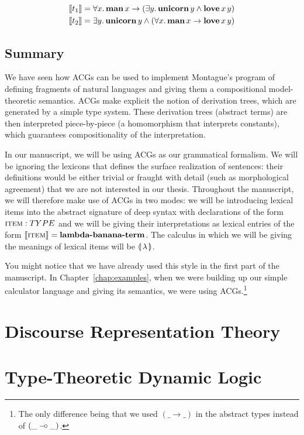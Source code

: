\begin{align*}
  \llbracket t_1 \rrbracket &= \forall x.\, \textbf{man}\,x \to (\exists y.\, \textbf{unicorn}\,y \land \textbf{love}\,x\,y) \\
  \llbracket t_2 \rrbracket &= \exists y.\, \textbf{unicorn}\,y \land (\forall x.\, \textbf{man}\,x \to \textbf{love}\,x\,y)
\end{align*}


\subsection{Summary}
\label{ssec:acg-summary}

We have seen how ACGs can be used to implement Montague's program of
defining fragments of natural languages and giving them a compositional
model-theoretic semantics. ACGs make explicit the notion of derivation
trees, which are generated by a simple type system. These derivation trees
(abstract terms) are then interpreted piece-by-piece (a homomorphism that
interprets constants), which guarantees compositionality of the
interpretation.

In our manuscript, we will be using ACGs as our grammatical formalism. We
will be ignoring the lexicons that defines the surface realization of
sentences: their definitions would be either trivial or fraught with detail
(such as morphological agreement) that we are not interested in our
thesis. Throughout the manuscript, we will therefore make use of ACGs in
two modes: we will be introducing lexical items into the abstract signature
of deep syntax with declarations of the form $\textsc{item} : TYPE$ and we
will be giving their interpretations as lexical entries of the form
$\llbracket \textsc{item} \rrbracket = \textbf{lambda-banana-term}$. The calculus in which we
will be giving the meanings of lexical items will be ${\llparenthesis \, \lambda \, \rrparenthesis}$.

You might notice that we have already used this style in the first part of
the manuscript. In Chapter~\ref{chap:examples}, when we were building up
our simple calculator language and giving its semantics, we were using
ACGs.\footnote{The only difference being that we used $(\_ \to \_)$ in the
  abstract types instead of $(\_ \mathbin{{-}\mkern-3.5mu{\circ}} \_)$.}


\section{Discourse Representation Theory}
\label{sec:drt}




\section{Type-Theoretic Dynamic Logic}
\label{sec:ttdl}
